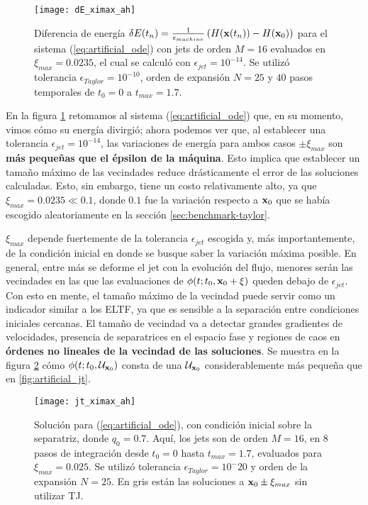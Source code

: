 \begin{figure}[h!]
	\centering
	\texttt{[image: dE\_ximax\_ah]}
	\caption{Diferencia de energía $\delta E(t_n) = \frac{1}{\epsilon_{machine}} \left( H(\mathbf{x}(t_n)) - H(\mathbf{x}_0) \right)$ para el sistema (\ref{eq:artificial_ode}) con jets de orden $M=16$ evaluados en $\xi_{max} = 0.0235$, el cual se calculó con $\epsilon_{jet} = 10^{-14}$. Se utilizó tolerancia $\epsilon_{Taylor} = 10^{-10}$, orden de expansión $N = 25$ y $40$ pasos temporales de $t_0 = 0$ a $t_{max} = 1.7$.}
	\label{fig:dE_ximax_ah}
\end{figure}

En la figura \ref{fig:dE_ximax_ah} retomamos al sistema (\ref{eq:artificial_ode}) que, en su momento, vimos cómo su energía divirgió; ahora podemos ver que, al establecer una tolerancia $\epsilon_{jet} = 10^{-14}$, las variaciones de energía para ambos casos $\pm \xi_{max}$ son \textbf{más pequeñas que el épsilon de la máquina}. Esto implica que establecer un tamaño máximo de las vecindades reduce drásticamente el error de las soluciones calculadas. Esto, sin embargo, tiene un costo relativamente alto, ya que $\xi_{max} = 0.0235 \ll 0.1$, donde $0.1$ fue la variación respecto a $\mathbf{x}_0$ que se había escogido aleatoriamente en la sección \ref{sec:benchmark-taylor}. 

$\xi_{max}$ depende fuertemente de la tolerancia $\epsilon_{jet}$ escogida y, más importantemente, de la condición inicial en donde se busque saber la variación máxima posible. En general, entre más se deforme el jet con la evolución del flujo, menores serán las vecindades en las que las evaluaciones de $\phi(t;t_0,\mathbf{x}_0 + \xi)$ queden debajo de $\epsilon_{jet}$. Con esto en mente, el tamaño máximo de la vecindad puede servir como un indicador similar a los ELTF, ya que es sensible a la separación entre condiciones iniciales cercanas. El tamaño de vecindad va a detectar grandes gradientes de velocidades, presencia de separatrices en el espacio fase y regiones de caos en \textbf{órdenes no lineales de la vecindad de las soluciones}. Se muestra en la figura \ref{fig:jt_ximax_ah} cómo $\phi(t;t_0,\mathcal{U}_{\mathbf{x}_0} )$ consta de una $\mathcal{U}_{\mathbf{x}_0}$ considerablemente más pequeña que en \ref{fig:artificial_jt}.

\begin{figure}[h!]
 \centering
 \texttt{[image: jt\_ximax\_ah]}
 \caption{Solución para (\ref{eq:artificial_ode}), con condición inicial sobre la separatriz, donde $q_0 = 0.7$. Aquí, los jets son de orden $M=16$, en $8$ pasos de integración desde $t_0 = 0$ hasta $t_{max} = 1.7$, evaluados para $\xi_{max} = 0.025$. Se utilizó tolerancia $\epsilon_{Taylor} = 10^-{20}$ y orden de la expansión $N=25$. En gris están las soluciones a $\mathbf{x}_0 \pm \xi_{max}$ sin utilizar TJ.}
 \label{fig:jt_ximax_ah}
\end{figure}

